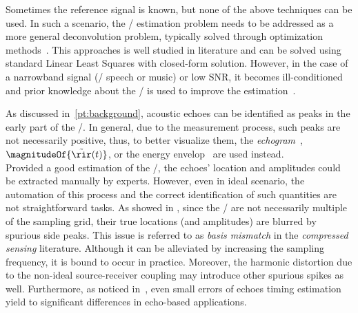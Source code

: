 \mynewline
Sometimes the reference signal is known, but none of the above techniques can be used.
In such a scenario, the \RIR/ estimation problem needs to be addressed as a more general deconvolution problem, typically solved through optimization methods~.
This approaches is well studied in literature and can be solved using standard Linear Least Squares with closed-form solution.
However, in the case of a narrowband signal (\eg/ speech or music) or low SNR, it becomes ill-conditioned and prior knowledge about the \RIR/ is used to improve the estimation~.

As discussed in~\cref{pt:background}, acoustic echoes can be identified as peaks in the early part of the \RIR/.
In general, due to the measurement process, such peaks are not necessarily positive, thus, to better visualize them, the \textit{echogram}~, $\magnitudeOf{\tilde{\rir}(t)}$, or the energy envelop~ are used instead.
\\Provided a good estimation of the \RIR/, the echoes' location and amplitudes could be extracted manually by experts.
However, even in ideal scenario, the automation of this process and the correct identification of such quantities are not straightforward tasks.
As showed in , since the \TOAs/ are not necessarily multiple of the sampling grid, their true locations (and amplitudes) are blurred by spurious side peaks.
This issue is referred to as \textit{basis mismatch} in the \textit{compressed sensing} literature.
Although it can be alleviated by increasing the sampling frequency, it is bound to occur in practice.
Moreover, the harmonic distortion due to the non-ideal source-receiver coupling may introduce other spurious spikes as well.
Furthermore, as noticed in~, even small errors of echoes timing estimation yield to significant differences in echo-based applications.

